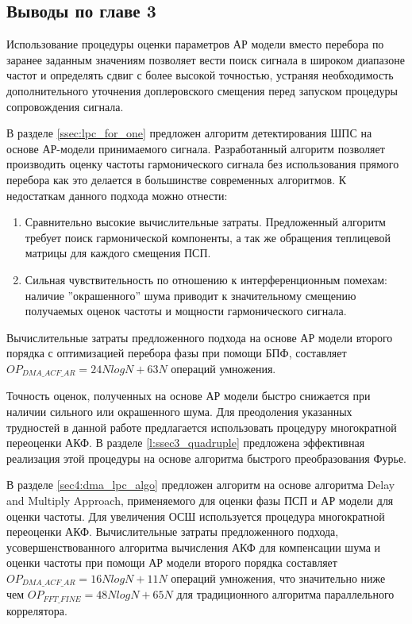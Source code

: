 \subsection*{Выводы по главе 3}

Использование процедуры оценки параметров АР модели вместо перебора по заранее заданным значениям позволяет вести поиск сигнала
в широком диапазоне частот и определять сдвиг с более высокой точностью, устраняя необходимость дополнительного уточнения
доплеровского смещения перед запуском процедуры сопровождения сигнала.

В разделе \ref{ssec:lpc_for_one} предложен алгоритм детектирования ШПС на основе АР-модели принимаемого сигнала.
Разработанный алгоритм позволяет производить оценку частоты гармонического сигнала без использования прямого
перебора как это делается в большинстве современных алгоритмов. К недостаткам данного подхода можно отнести: 
\begin{enumerate}
	\item Сравнительно высокие вычислительные затраты. Предложенный алгоритм требует поиск гармонической
		компоненты, а так же обращения теплицевой матрицы для каждого смещения ПСП.
	\item Сильная чувствительность по отношению к интерференционным помехам: наличие
		''окрашенного'' шума приводит к значительному смещению получаемых
		оценок частоты и мощности гармонического сигнала.
\end{enumerate}

Вычислительные затраты предложенного подхода на основе АР модели второго порядка с оптимизацией перебора фазы при помощи БПФ,
составляет ${OP_{DMA\_ACF\_AR}=24NlogN+63N}$ операций умножения.

Точность оценок, полученных на основе АР модели быстро снижается при наличии сильного или окрашенного шума. Для преодоления указанных
трудностей в данной работе предлагается использовать процедуру многократной переоценки АКФ. В разделе \ref{l:ssec3_quadruple} предложена
эффективная реализация этой процедуры на основе алгоритма быстрого преобразования Фурье.

В разделе \ref{sec4:dma_lpc_algo} предложен алгоритм на основе алгоритма Delay and Multiply Approach, применяемого для оценки фазы ПСП и 
АР модели для оценки частоты. Для увеличения ОСШ используется процедура многократной переоценки АКФ.
Вычислительные затраты предложенного подхода,
усовершенствованного алгоритма вычисления АКФ для компенсации шума и оценки частоты при помощи АР модели второго порядка составляет
${OP_{DMA\_ACF\_AR}=16NlogN+11N}$
операций умножения, что значительно ниже чем ${OP_{FFT\_FINE}=48NlogN+65N}$ для традиционного алгоритма параллельного коррелятора.

\newpage
